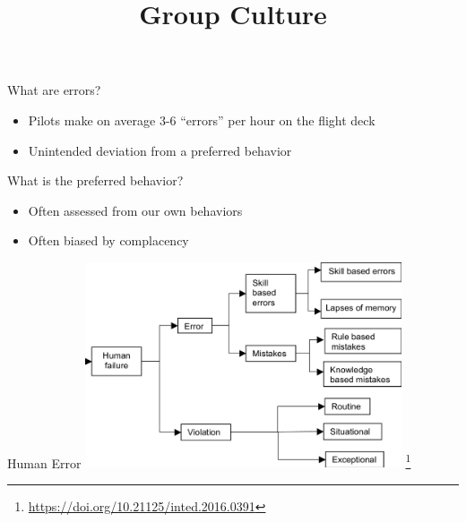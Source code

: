\documentclass[aspectratio=169,notes]{beamer}
\title{Group Culture}
\institute{Engineers for Exploration, UC San Diego}
\begin{document}
\maketitle
\begin{frame}{What are errors?}
    \begin{itemize}
        \item Pilots make on average 3-6 ``errors'' per hour on the flight deck
        \item Unintended deviation from a preferred behavior
    \end{itemize}
\end{frame}
\begin{frame}{What is the preferred behavior?}
    \begin{itemize}
        \item Often assessed from our own behaviors
        \item Often biased by complacency
    \end{itemize}
\end{frame}
\begin{frame}{Human Error}
    \centering
    \includegraphics[width=0.7\textwidth]{types_of_human_failure.png} \footnote{\url{https://doi.org/10.21125/inted.2016.0391}}
\end{frame}
\end{document}

